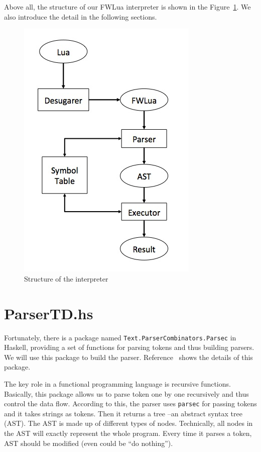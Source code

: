 Above all, the structure of our FWLua interpreter is shown in the Figure~\ref {fig:structure}. We also introduce the detail in the following sections. 

\begin{figure}
\centering
\caption{Structure of the interpreter}
\label{fig:structure}
\includegraphics[scale = 0.9]{Interpreter}
\end{figure}

\section{ParserTD.hs}
Fortunately, there is a package named {\tt Text.ParserCombinators.Parsec} in Haskell, providing a set of functions for parsing tokens and thus building parsers. We will use this package to build the parser. Reference~\cite{IHAS} shows the details of this package.

The key role in a functional programming language is recursive functions. Basically, this package allows us to parse token one by one recursively and thus control the data flow. According to this, the parser uses {\tt parsec} for passing tokens and it takes strings as tokens. Then it returns a tree --an abstract syntax tree (AST).
The AST is made up of different types of nodes.
Technically, all nodes in the AST will exactly represent the whole program. Every time it parses a token, AST should be modified (even could be ``do nothing'').

